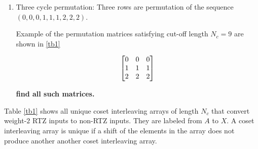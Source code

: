\documentclass[11pt, oneside, dvipdfmx]{book}
\begin{document}
\begin{enumerate}
	There are no permutation matrices that satisfying cut-off length $N_c $. This is because the sequence length is not divisible by $N_c$, there will always be 2 elements of the same value in each row of $\bPi$
	
	
	\item Three cycle permutation: Three rows are permutation of the sequence$(0,0,0,1,1,1,2,2,2)$. 
	
	Example of the permutation matrices satisfying cut-off length $N_c = 9$ are shown in \ref{tb1}
	
	\begin{eqnarray}
	\begin{bmatrix}
	0 & 0 & 0\cr
	1 & 1 & 1\cr
	2 & 2 & 2
	\end{bmatrix}
	\label{Eq:2}
	\end{eqnarray}
	
	{\bf find all such matrices.}
\end{enumerate}





Table \ref{tb1} shows all unique coset interleaving arrays of length $N_c$ that convert weight-$2$ RTZ inputs to non-RTZ inputs. They are labeled from $A$ to $X$. A coset interleaving array is unique if a shift of the elements in the array does not produce another another coset interleaving array.
\end{document}

